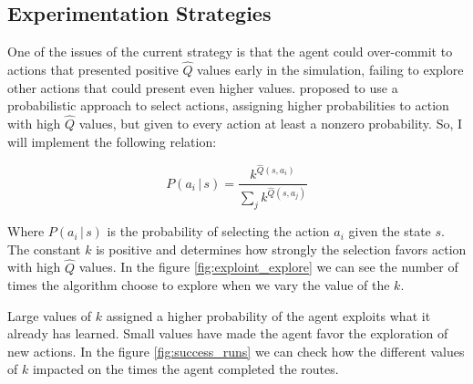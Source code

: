 \documentclass[a4paper]{article}
\begin{document}
\subsection{Experimentation Strategies}
One of the issues of the current strategy is that the agent could over-commit to actions that presented positive $\hat{Q}$ values early in the simulation, failing to explore other actions that could present even higher values. \cite{Mitchell} proposed to use a probabilistic approach to select actions, assigning higher probabilities to action with high $\hat{Q}$ values, but given to every action at least a nonzero probability. So, I will implement the following relation:

$$P(a_i\, | \,s ) = \frac{k ^{\hat{Q}(s, a_i)}}{\sum_j k^{\hat{Q}(s, a_j)}}$$

Where $P(a_i\, | \,s )$ is the probability of selecting the action $a_i$ given the state $s$. The constant $k$ is positive and determines how strongly the selection favors action with high $\hat{Q}$ values. In the figure \ref{fig:exploint_explore} we can see the number of times the algorithm choose to explore when we vary the value of the $k$.

Large values of $k$ assigned a higher probability of the agent exploits what it already has learned. Small values have made the agent favor the exploration of new actions. In the figure \ref{fig:success_runs} we can check how the different values of $k$ impacted on the times the agent completed the routes.
\end{document}
